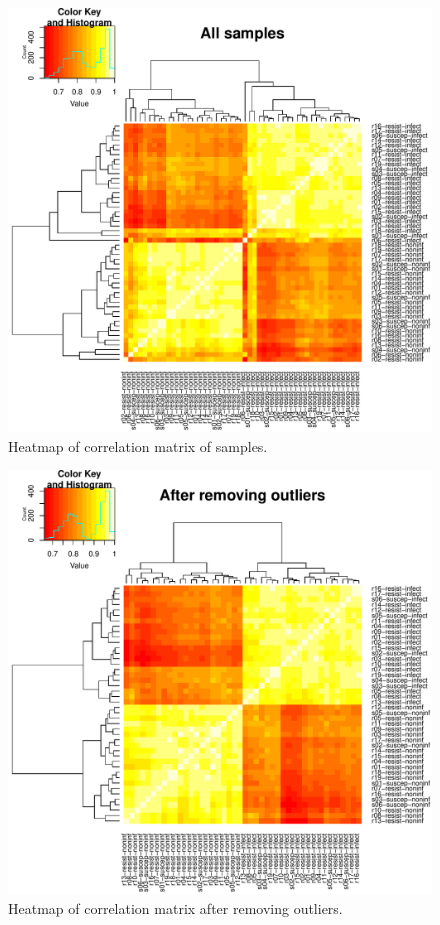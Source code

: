 \documentclass[fleqn,10pt]{wlscirep}
\begin{document}
\begin{figure}[ht]
\centering
\includegraphics[width=\linewidth]{../figure/heatmap-all-samples.pdf}
\caption{
Heatmap of correlation matrix of samples.
}
\label{fig:heat-all}
\end{figure}

\begin{figure}[ht]
\centering
\includegraphics[width=\linewidth]{../figure/heatmap-no-outliers.pdf}
\caption{
Heatmap of correlation matrix after removing outliers.
}
\label{fig:heat-filt}
\end{figure}
\end{document}
